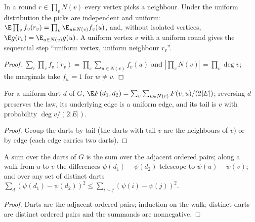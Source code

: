 \begin{lemma}\label{lem:neighborround}
\leanok
{}
In a round $r\in\prod_vN(v)$ every vertex picks a neighbour. Under the uniform
distribution the picks are independent and uniform:
$\E\prod_vf_v(r_v)=\prod_v\E_{u\in N(v)}f_v(u)$, and, without isolated
vertices, $\E g(r_v)=\E_{u\in N(v)}g(u)$. A uniform vertex $v$ with a uniform
round gives the sequential step ``uniform vertex, uniform neighbour $r_v$''.
\end{lemma}
\begin{proof}\leanok
$\sum_r\prod_vf_v(r_v)=\prod_v\sum_{u\in N(v)}f_v(u)$ and
$|\prod_vN(v)|=\prod_v\deg v$; the marginals take $f_w=1$ for $w\ne v$.
\end{proof}
\begin{lemma}\label{lem:edgeround}
\leanok
{}
For a uniform dart $d$ of $G$,
$\E F(d_1,d_2)=\sum_v\sum_{u\in N(v)}F(v,u)/(2|E|)$; reversing $d$ preserves
the law, its underlying edge is a uniform edge, and its tail is $v$ with
probability $\deg v/(2|E|)$.
\end{lemma}
\begin{proof}\leanok
Group the darts by tail (the darts with tail $v$ are the neighbours of $v$)
or by edge (each edge carries two darts).
\end{proof}
\begin{lemma}\label{lem:dartsums}
\leanok
A sum over the darts of $G$ is the sum over the adjacent ordered pairs; along a walk from
$u$ to $v$ the differences $\psi(d_1)-\psi(d_2)$ telescope to $\psi(u)-\psi(v)$; and over
any set of distinct darts $\sum_d(\psi(d_1)-\psi(d_2))^2\le\sum_{i\sim j}(\psi(i)-\psi(j))^2$.
\end{lemma}
\begin{proof}\leanok
Darts are the adjacent ordered pairs; induction on the walk; distinct darts are distinct
ordered pairs and the summands are nonnegative.
\end{proof}

